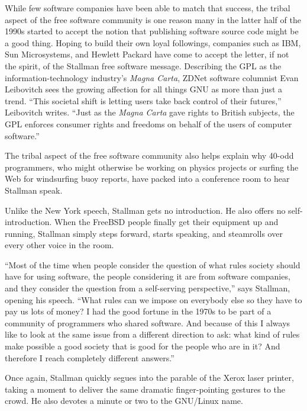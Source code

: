 While few software companies have been able to match that success, the tribal aspect of the free software community is one reason many in the latter half of the 1990s started to accept the notion that publishing software source code might be a good thing. Hoping to build their own loyal followings, companies such as IBM, Sun Microsystems, and Hewlett Packard have come to accept the letter, if not the spirit, of the Stallman free software message. Describing the GPL as the information-technology industry's \textit{Magna Carta}, ZDNet software columnist Evan Leibovitch sees the growing affection for all things GNU as more than just a trend. ``This societal shift is letting users take back control of their futures,'' Leibovitch writes. ``Just as the \textit{Magna Carta} gave rights to British subjects, the GPL enforces consumer rights and freedoms on behalf of the users of computer software.''

The tribal aspect of the free software community also helps explain why 40-odd programmers, who might otherwise be working on physics projects or surfing the Web for windsurfing buoy reports, have packed into a conference room to hear Stallman speak.

Unlike the New York speech, Stallman gets no introduction. He also offers no self-introduction. When the FreeBSD people finally get their equipment up and running, Stallman simply steps forward, starts speaking, and steamrolls over every other voice in the room.

``Most of the time when people consider the question of what rules society should have for using software, the people considering it are from software companies, and they consider the question from a self-serving perspective,'' says Stallman, opening his speech. ``What rules can we impose on everybody else so they have to pay us lots of money? I had the good fortune in the 1970s to be part of a community of programmers who shared software. And because of this I always like to look at the same issue from a different direction to ask: what kind of rules make possible a good society that is good for the people who are in it? And therefore I reach completely different answers.''

Once again, Stallman quickly segues into the parable of the Xerox laser printer, taking a moment to deliver the same dramatic finger-pointing gestures to the crowd. He also devotes a minute or two to the GNU/Linux name.

